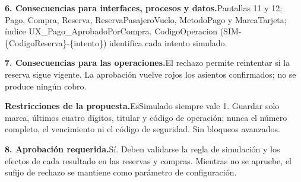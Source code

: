 \documentclass[11pt,a4paper]{article}
\newcommand{\fichacampo}[2]{\noindent\textbf{\color{azulvip}#1}\enspace #2\par\vspace{3pt}}
\begin{document}
{\fichacampo{6. Consecuencias para interfaces, procesos y datos.}{Pantallas 11 y 12; Pago, Compra, Reserva, ReservaPasajeroVuelo, MetodoPago y MarcaTarjeta; índice UX\_Pago\_AprobadoPorCompra. CodigoOperacion (SIM-\{CodigoReserva\}-\{intento\}) identifica cada intento simulado.}
\fichacampo{7. Consecuencias para las operaciones.}{El rechazo permite reintentar si la reserva sigue vigente. La aprobación vuelve rojos los asientos confirmados; no se produce ningún cobro.}
\fichacampo{Restricciones de la propuesta.}{EsSimulado siempre vale 1. Guardar solo marca, últimos cuatro dígitos, titular y código de operación; nunca el número completo, el vencimiento ni el código de seguridad. Sin bloqueos avanzados.}
\fichacampo{8. Aprobación requerida.}{Sí. Deben validarse la regla de simulación y los efectos de cada resultado en las reservas y compras. Mientras no se apruebe, el sufijo de rechazo se mantiene como parámetro de configuración.}
}
\clearpage
\end{document}
